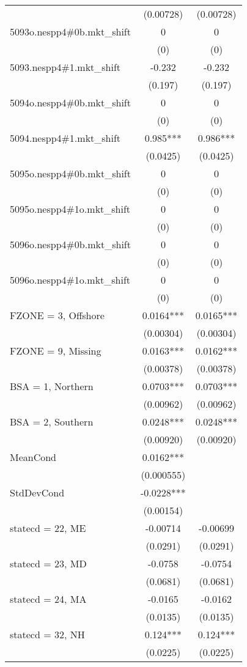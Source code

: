 \begin{tabular}{lcc}
 & (0.00728) & (0.00728) \\
5093o.nespp4\#0b.mkt\_shift & 0 & 0 \\
 & (0) & (0) \\
5093.nespp4\#1.mkt\_shift & -0.232 & -0.232 \\
 & (0.197) & (0.197) \\
5094o.nespp4\#0b.mkt\_shift & 0 & 0 \\
 & (0) & (0) \\
5094.nespp4\#1.mkt\_shift & 0.985*** & 0.986*** \\
 & (0.0425) & (0.0425) \\
5095o.nespp4\#0b.mkt\_shift & 0 & 0 \\
 & (0) & (0) \\
5095o.nespp4\#1o.mkt\_shift & 0 & 0 \\
 & (0) & (0) \\
5096o.nespp4\#0b.mkt\_shift & 0 & 0 \\
 & (0) & (0) \\
5096o.nespp4\#1o.mkt\_shift & 0 & 0 \\
 & (0) & (0) \\
FZONE = 3, Offshore & 0.0164*** & 0.0165*** \\
 & (0.00304) & (0.00304) \\
FZONE = 9, Missing & 0.0163*** & 0.0162*** \\
 & (0.00378) & (0.00378) \\
BSA = 1, Northern & 0.0703*** & 0.0703*** \\
 & (0.00962) & (0.00962) \\
BSA = 2, Southern & 0.0248*** & 0.0248*** \\
 & (0.00920) & (0.00920) \\
MeanCond & 0.0162*** &  \\
 & (0.000555) &  \\
StdDevCond & -0.0228*** &  \\
 & (0.00154) &  \\
statecd = 22, ME & -0.00714 & -0.00699 \\
 & (0.0291) & (0.0291) \\
statecd = 23, MD & -0.0758 & -0.0754 \\
 & (0.0681) & (0.0681) \\
statecd = 24, MA & -0.0165 & -0.0162 \\
 & (0.0135) & (0.0135) \\
statecd = 32, NH & 0.124*** & 0.124*** \\
 & (0.0225) & (0.0225) \\

\end{tabular}
